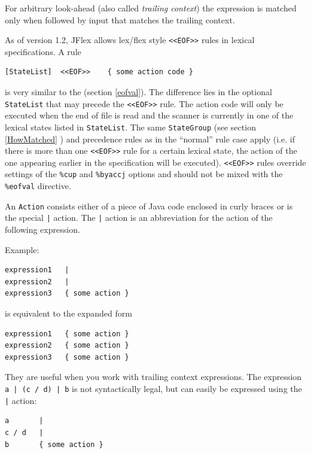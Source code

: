 \documentclass[11pt]{scrartcl}
\newcommand{\trit}{\em}
\begin{document}
\label{trailingContext}
For arbitrary look-ahead (also called {\trit trailing context}) the 
expression is matched only when followed by input that matches the
trailing context. 

\label{EOFRule}
As of version 1.2, JFlex allows lex/flex style \texttt{<<EOF>>} rules in
lexical specifications. A rule
\begin{verbatim}
[StateList]  <<EOF>>    { some action code }
\end{verbatim}
is very similar to the  (section \ref{eofval}). 
The difference lies in the optional \texttt{StateList} that may precede the \texttt{<<EOF>>} rule. The
action code will only be executed when the end of file is read and the
scanner is currently in one of the lexical states listed in \texttt{StateList}. 
The same \texttt{StateGroup} (see section \ref{HowMatched} 
) and precedence 
rules as in the ``normal'' rule case apply 
(i.e. if there is more than one \texttt{<<EOF>>} 
rule for a certain lexical state, the action of the one appearing 
earlier in the specification will be executed). \texttt{<<EOF>>} rules 
override settings of the \texttt{\%cup} and \texttt{\%byaccj} options and 
should not be mixed with the \texttt{\%eofval} directive.

An \texttt{Action} consists either of a piece of Java code enclosed in
curly braces or is the special \verb+|+ action. The \verb+|+ action is
an abbreviation for the action of the following expression.

Example:
\begin{verbatim}
expression1   |
expression2   |
expression3   { some action }
\end{verbatim}
is equivalent to the expanded form
\begin{verbatim}
expression1   { some action }
expression2   { some action }
expression3   { some action }
\end{verbatim}

They are useful when you work with trailing context expressions. The 
expression \texttt{a | (c / d) | b} is not syntactically legal, but can 
easily be expressed using the \verb+|+ action:
\begin{verbatim}
a       |
c / d   |
b       { some action }
\end{verbatim}
\end{document}
